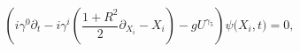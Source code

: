 \begin{equation}
\label{Dirac1}
\left( i \gamma^0 \partial_t - 
i \gamma^i \left(\frac{1+R^2}{2} \partial_{X_i} - X_i \right)
- g U^{\gamma_5}
\right)
\psi \big(X_i,t \big) = 0, 
\end{equation}

